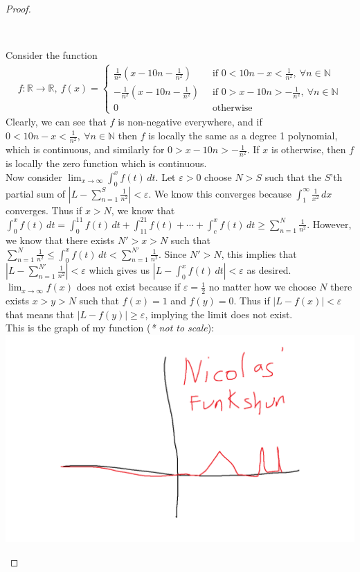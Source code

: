 \documentclass[11pt]{article}
\newcommand{\R}{\mathbb{R}}
\newcommand{\N}{\mathbb{N}}
\newenvironment{myproof}
{\begin{proof} \begin{adjustwidth}{3em}{0pt}$ $\par\nobreak\ignorespaces}
{\end{adjustwidth} \end{proof}}
\begin{document}
\begin{flushleft}
\begin{myproof}
Consider the function 
\begin{align*}
f: \R \to \R, \ f(x) = \begin{cases} \frac{1}{n^2} (x-10n-\frac{1}{n^2}) & \ \text{ if } 0 < 10n-x < \frac{1}{n^2}, \ \forall n \in \N \\ -\frac{1}{n^2} (x-10n-\frac{1}{n^2}) &  \ \text{ if } 0 > x-10n > -\frac{1}{n^2}, \ \forall n \in \N \\ 0 & \ \text{ otherwise} \end{cases}
\end{align*}
Clearly, we can see that $f$ is non-negative everywhere, and if $0 < 10n-x < \frac{1}{n^2}, \ \forall n \in \N$ then $f$ is locally the same as a degree 1 polynomial, which is continuous, and similarly for $0 > x-10n > -\frac{1}{n^2}$. If $x$ is otherwise, then $f$ is locally the zero function which is continuous. \\
\bigskip
Now consider $\lim_{x \to \infty} \int_0^x f(t) \,dt$. Let $\varepsilon > 0$ choose $N > S$ such that the $S$'th partial sum of $|L-\sum_{n = 1}^{S}\frac{1}{n^2}| < \varepsilon$. We know this converges because $\int_1^\infty \frac{1}{x^2} \,dx$ converges. Thus if $x > N$, we know that $\int_0^x f(t) \,dt = \int_0^{11}f(t) \,dt + \int_{11}^{21}f(t) + \cdots + \int_c^x f(t) \,dt \geq \sum_{n = 1}^{N}\frac{1}{n^2}$. However, we know that there exists $N' > x > N$ such that $\sum_{n = 1}^{N}\frac{1}{n^2} \leq \int_0^x f(t) \,dt < \sum_{n = 1}^{N'}\frac{1}{n^2}$. Since $N' > N$, this implies that $|L - \sum_{n=1}^{N'} \frac{1}{n^2}| < \varepsilon$ which gives us $|L - \int_0^x f(t) \,dt| < \varepsilon$  as desired.\\
\bigskip
$\lim_{x \to \infty}f(x)$ does not exist because if $\varepsilon = \frac{1}{2}$ no matter how we choose $N$ there exists $x > y > N$ such that $f(x) = 1$ and $f(y) = 0$. Thus if $|L-f(x)|< \varepsilon$ that means that $|L-f(y)| \geq \varepsilon$, implying the limit does not exist.\\
\bigskip
This is the graph of my function (\textit{* not to scale}):
\includegraphics[width=\textwidth]{nicofunkshun.png}
\end{myproof}

\end{flushleft}
\end{document}
